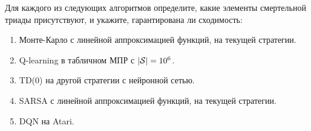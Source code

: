 \begin{exercise}
\label{ex:deadly-triad-identify}
Для каждого из следующих алгоритмов определите, какие элементы смертельной триады присутствуют, и укажите, гарантирована ли сходимость:
\begin{enumerate}
\item Монте-Карло с линейной аппроксимацией функций, на текущей стратегии.
\item Q-learning в табличном МПР с $|\mathcal{S}| = 10^6$.
\item TD(0) на другой стратегии с нейронной сетью.
\item SARSA с линейной аппроксимацией функций, на текущей стратегии.
\item DQN на Atari.
\end{enumerate}
\end{exercise}
